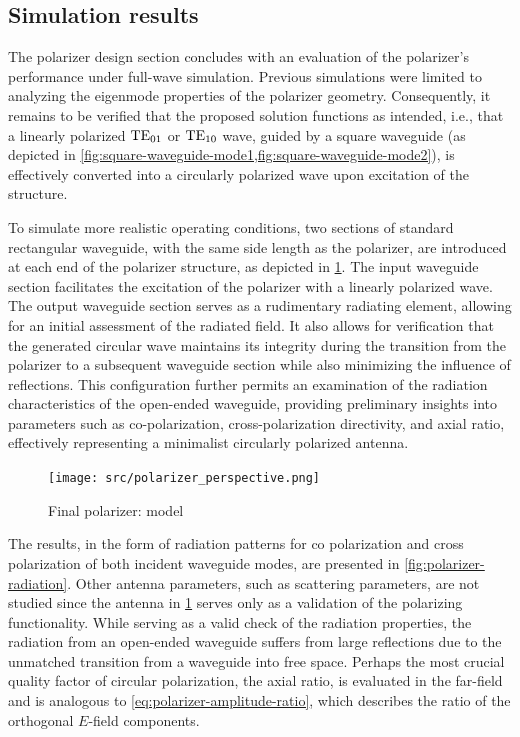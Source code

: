 \documentclass[14pt,a4paper]{ntust_report}
\begin{document}
\subsection{Simulation results}
The polarizer design section concludes with an evaluation of the polarizer's performance under full-wave simulation. Previous simulations were limited to analyzing the eigenmode properties of the polarizer geometry. Consequently, it remains to be verified that the proposed solution functions as intended, i.e., that a linearly polarized $\text{TE}_{01}$ or $\text{TE}_{10}$ wave, guided by a square waveguide (as depicted in \cref{fig:square-waveguide-mode1,fig:square-waveguide-mode2}), is effectively converted into a circularly polarized wave upon excitation of the structure.

To simulate more realistic operating conditions, two sections of standard rectangular waveguide, with the same side length as the polarizer, are introduced at each end of the polarizer structure, as depicted in \cref{fig:polarizer-perspective}. The input waveguide section facilitates the excitation of the polarizer with a linearly polarized wave. The output waveguide section serves as a rudimentary radiating element, allowing for an initial assessment of the radiated field. It also allows for verification that the generated circular wave maintains its integrity during the transition from the polarizer to a subsequent waveguide section while also minimizing the influence of reflections. This configuration further permits an examination of the radiation characteristics of the open-ended waveguide, providing preliminary insights into parameters such as co-polarization, cross-polarization directivity, and axial ratio, effectively representing a minimalist circularly polarized antenna.

\begin{figure}[!ht]
    \centering
    \texttt{[image: src/polarizer\_perspective.png]}
    \caption{\label{fig:polarizer-perspective}Final polarizer: model}
\end{figure}

The results, in the form of radiation patterns for co polarization and cross polarization of both incident waveguide modes, are presented in \cref{fig:polarizer-radiation}. Other antenna parameters, such as scattering parameters, are not studied since the antenna in \cref{fig:polarizer-perspective} serves only as a validation of the polarizing functionality. While serving as a valid check of the radiation properties, the radiation from an open-ended waveguide suffers from large reflections due to the unmatched transition from a waveguide into free space. Perhaps the most crucial quality factor of circular polarization, the axial ratio, is evaluated in the far-field and is analogous to \cref{eq:polarizer-amplitude-ratio}, which describes the ratio of the orthogonal $E$-field components.
\end{document}
